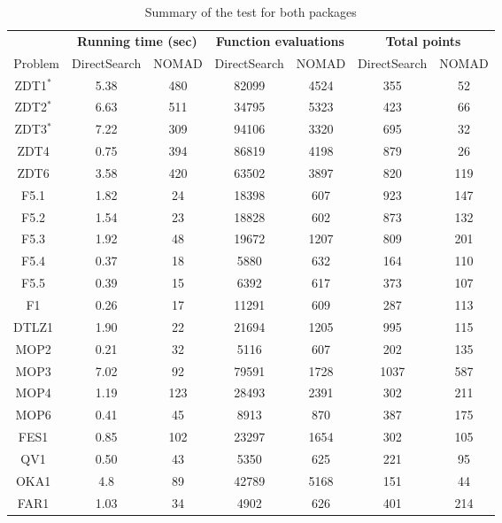 \documentclass[11pt,oneside,onecolumn,openright]{article}
\begin{document}
\begin{table}[]
  \centering
  \caption{Summary of the test for both packages}
    \begin{tabular}{c|cc|cc|cc}
    \toprule
     & \multicolumn{2}{c|}{\textbf{Running time (sec)}} & \multicolumn{2}{c|}{\textbf{Function evaluations}} & \multicolumn{2}{c}{\textbf{Total points}} \\
     Problem & DirectSearch & NOMAD & DirectSearch & NOMAD & DirectSearch & NOMAD\\
    \hline
    ZDT1$^*$~\cite{huband2006review} & 5.38 & 480 & 82099 &4524 &355 & 52\\
    ZDT2$^*$~\cite{huband2006review} & 6.63 & 511 & 34795  & 5323 & 423 & 66 \\
    ZDT3$^*$~\cite{huband2006review} & 7.22 & 309 & 94106 & 3320 & 695 & 32 \\
    ZDT4~\cite{huband2006review} & 0.75 & 394 & 86819 & 4198 & 879 & 26 \\
    ZDT6~\cite{huband2006review} & 3.58 & 420 & 63502 & 3897 & 820 & 119 \\
    F5.1~\cite{audet2008multiobjective} & 1.82 & 24 & 18398 & 607 & 923 & 147 \\
    F5.2~\cite{audet2008multiobjective} & 1.54 & 23 & 18828 & 602 & 873 & 132  \\
    F5.3~\cite{audet2008multiobjective} & 1.92 & 48 & 19672 & 1207& 809 & 201 \\
    F5.4~\cite{audet2008multiobjective} & 0.37 & 18 & 5880 & 632 & 164 & 110 \\
    F5.5~\cite{audet2008multiobjective} & 0.39 & 15 & 6392  & 617 & 373 & 107 \\
    F1~\cite{brockhoff2016using} & 0.26 & 17 & 11291 & 609 & 287 & 113 \\
    DTLZ1~\cite{huband2006review} & 1.90 & 22 & 21694 & 1205 & 995 & 115 \\
    MOP2~\cite{huband2006review} & 0.21 & 32 & 5116 & 607 & 202 & 135 \\
    MOP3~\cite{huband2006review} & 7.02 & 92 & 79591 & 1728 & 1037 & 587 \\
    MOP4~\cite{huband2006review} & 1.19 & 123 & 28493 & 2391 & 302 & 211 \\
    MOP6~\cite{huband2006review} & 0.41 & 45 & 8913 & 870 & 387 & 175 \\
    FES1~\cite{huband2006review} & 0.85 & 102 & 23297 & 1654 & 302 & 105 \\
    QV1~\cite{huband2006review} & 0.50 & 43 & 5350 & 625 & 221 & 95 \\
    OKA1~\cite{davidor1994parallel} & 4.8 & 89 & 42789 & 5168 & 151 & 44 \\
    FAR1~\cite{huband2006review} & 1.03 & 34 & 4902 & 626 & 401 & 214 \\
    \bottomrule
    \end{tabular}%
  \label{tab:res_set}%
\end{table}%
\end{document}

